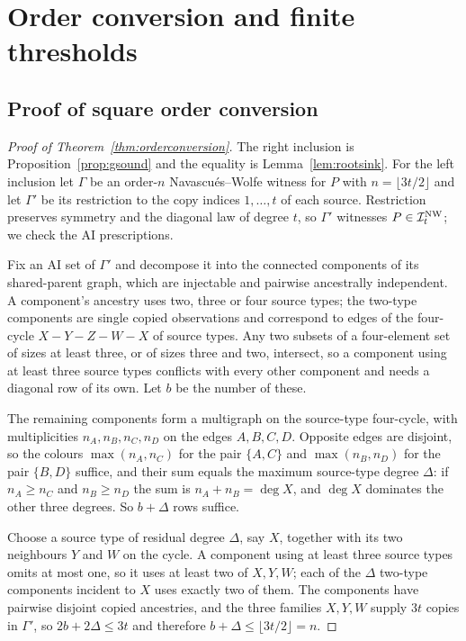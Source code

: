 \section{Order conversion and finite thresholds}\label{app:quantitative}

\subsection{Proof of square order conversion}\label{app:conversion}

\begin{proof}[Proof of Theorem~\ref{thm:orderconversion}]
The right inclusion is Proposition~\ref{prop:gsound} and the equality is Lemma~\ref{lem:rootsink}. For the left inclusion let $\Gamma$ be an order-$n$ Navascu\'es--Wolfe witness for $P$ with $n=\lfloor3t/2\rfloor$ and let $\Gamma'$ be its restriction to the copy indices $1,\dots,t$ of each source. Restriction preserves symmetry and the diagonal law of degree $t$, so $\Gamma'$ witnesses $P\in\mathcal I^{\mathrm{NW}}_t$; we check the AI prescriptions.

Fix an AI set of $\Gamma'$ and decompose it into the connected components of its shared-parent graph, which are injectable and pairwise ancestrally independent. A component's ancestry uses two, three or four source types; the two-type components are single copied observations and correspond to edges of the four-cycle $X-Y-Z-W-X$ of source types. Any two subsets of a four-element set of sizes at least three, or of sizes three and two, intersect, so a component using at least three source types conflicts with every other component and needs a diagonal row of its own. Let $b$ be the number of these.

The remaining components form a multigraph on the source-type four-cycle, with multiplicities $n_A,n_B,n_C,n_D$ on the edges $A,B,C,D$. Opposite edges are disjoint, so the colours $\max(n_A,n_C)$ for the pair $\{A,C\}$ and $\max(n_B,n_D)$ for the pair $\{B,D\}$ suffice, and their sum equals the maximum source-type degree $\Delta$: if $n_A\ge n_C$ and $n_B\ge n_D$ the sum is $n_A+n_B=\deg X$, and $\deg X$ dominates the other three degrees. So $b+\Delta$ rows suffice.

Choose a source type of residual degree $\Delta$, say $X$, together with its two neighbours $Y$ and $W$ on the cycle. A component using at least three source types omits at most one, so it uses at least two of $X,Y,W$; each of the $\Delta$ two-type components incident to $X$ uses exactly two of them. The components have pairwise disjoint copied ancestries, and the three families $X,Y,W$ supply $3t$ copies in $\Gamma'$, so $2b+2\Delta\le3t$ and therefore $b+\Delta\le\lfloor3t/2\rfloor=n$.


\end{proof}
